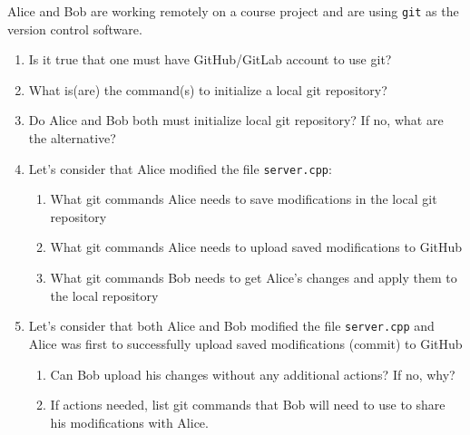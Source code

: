 \documentclass{report}
\begin{document}
\newpage


\begin{problem}

Alice and Bob are working remotely on a course project and are using \texttt{git} as the version control software.

\begin{enumerate}
\item Is it true that one must have GitHub/GitLab account to use git?
\item What is(are) the command(s) to initialize a local git repository?
\item Do Alice and Bob both must initialize local git repository?  If no, what are the alternative?
\item Let's consider that Alice modified the file \texttt{server.cpp}:
    \begin{enumerate}
    \item What git commands Alice needs to save modifications in the local git repository
    \item What git commands Alice needs to upload saved modifications to GitHub
    \item What git commands Bob needs to get Alice's changes and apply them to the local repository
    \end{enumerate}
\item Let's consider that both Alice and Bob modified the file \texttt{server.cpp} and Alice was first to successfully upload saved modifications (commit) to GitHub
  \begin{enumerate}
  \item Can Bob upload his changes without any additional actions? If no, why?
  \item If actions needed, list git commands that Bob will need to use to share his modifications with Alice.
  \end{enumerate}
\end{enumerate}


\end{problem}
\end{document}
